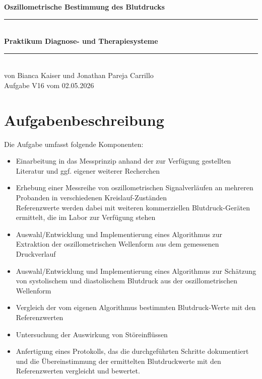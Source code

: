 \documentclass[a4paper, 11pt]{scrartcl}
\begin{document}

\begin{center}
{\LARGE \bfseries Oszillometrische Bestimmung des Blutdrucks }\\[6pt]
\rule{\linewidth}{0.4pt}
\phantom{hi} \\[-4pt]
{\Large \bfseries Praktikum Diagnose- und Therapiesysteme} \\[8pt] 
\rule{\linewidth}{0.4pt}
\phantom{hi} \\[-4pt]
{\large von Bianca Kaiser und Jonathan Pareja Carrillo} \\[4pt]
{\large Aufgabe V16 vom 02.05.2026}
\end{center}
\vspace{5pt}


\tableofcontents
\newpage

\section{Aufgabenbeschreibung}

Die Aufgabe umfasst folgende Komponenten:
\begin{itemize}
    \item Einarbeitung in das Messprinzip anhand der zur Verfügung gestellten Literatur und ggf. eigener weiterer Recherchen
    \item Erhebung einer Messreihe von oszillometrischen Signalverläufen an mehreren Probanden in verschiedenen Kreislauf-Zuständen \\ Referenzwerte werden dabei mit weiteren kommerziellen Blutdruck-Geräten ermittelt, die im Labor zur Verfügung stehen
    \item Auswahl/Entwicklung und Implementierung eines Algorithmus zur Extraktion der oszillometrischen Wellenform aus dem gemessenen Druckverlauf
    \item Auswahl/Entwicklung und Implementierung eines Algorithmus zur Schätzung von systolischem und diastolischem Blutdruck aus der oszillometrischen Wellenform
    \item Vergleich der vom eigenen Algorithmus bestimmten Blutdruck-Werte mit den Referenzwerten
    \item Untersuchung der Auswirkung von Störeinflüssen
    \item Anfertigung eines Protokolls, das die durchgeführten Schritte dokumentiert und die Übereinstimmung der ermittelten Blutdruckwerte mit den Referenzwerten vergleicht und bewertet. 
\end{itemize}
\end{document}
